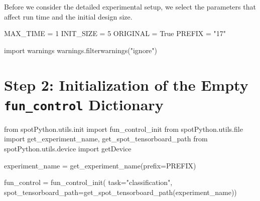 \documentclass[
  letterpaper,
  DIV=11,
  numbers=noendperiod]{scrreprt}
\newenvironment{Shaded}{\begin{snugshade}}{\end{snugshade}}
\newcommand{\BuiltInTok}[1]{\textcolor[rgb]{0.00,0.23,0.31}{#1}}
\newcommand{\DecValTok}[1]{\textcolor[rgb]{0.68,0.00,0.00}{#1}}
\newcommand{\ImportTok}[1]{\textcolor[rgb]{0.00,0.46,0.62}{#1}}
\newcommand{\NormalTok}[1]{\textcolor[rgb]{0.00,0.23,0.31}{#1}}
\newcommand{\OperatorTok}[1]{\textcolor[rgb]{0.37,0.37,0.37}{#1}}
\newcommand{\StringTok}[1]{\textcolor[rgb]{0.13,0.47,0.30}{#1}}
\newcommand{\VariableTok}[1]{\textcolor[rgb]{0.07,0.07,0.07}{#1}}
\begin{document}
Before we consider the detailed experimental setup, we select the
parameters that affect run time and the initial design size.

\begin{Shaded}
\begin{Highlighting}[]
\NormalTok{MAX\_TIME }\OperatorTok{=} \DecValTok{1}
\NormalTok{INIT\_SIZE }\OperatorTok{=} \DecValTok{5}
\NormalTok{ORIGINAL }\OperatorTok{=} \VariableTok{True}
\NormalTok{PREFIX }\OperatorTok{=} \StringTok{"17"}
\end{Highlighting}
\end{Shaded}

\begin{Shaded}
\begin{Highlighting}[]
\ImportTok{import}\NormalTok{ warnings}
\NormalTok{warnings.filterwarnings(}\StringTok{"ignore"}\NormalTok{)}
\end{Highlighting}
\end{Shaded}

\hypertarget{step-2-initialization-of-the-empty-fun_control-dictionary-2}{%
\section{\texorpdfstring{Step 2: Initialization of the Empty
\texttt{fun\_control}
Dictionary}{Step 2: Initialization of the Empty fun\_control Dictionary}}\label{step-2-initialization-of-the-empty-fun_control-dictionary-2}}

\begin{Shaded}
\begin{Highlighting}[]
\ImportTok{from}\NormalTok{ spotPython.utils.init }\ImportTok{import}\NormalTok{ fun\_control\_init}
\ImportTok{from}\NormalTok{ spotPython.utils.}\BuiltInTok{file} \ImportTok{import}\NormalTok{ get\_experiment\_name, get\_spot\_tensorboard\_path}
\ImportTok{from}\NormalTok{ spotPython.utils.device }\ImportTok{import}\NormalTok{ getDevice}

\NormalTok{experiment\_name }\OperatorTok{=}\NormalTok{ get\_experiment\_name(prefix}\OperatorTok{=}\NormalTok{PREFIX)}

\NormalTok{fun\_control }\OperatorTok{=}\NormalTok{ fun\_control\_init(}
\NormalTok{    task}\OperatorTok{=}\StringTok{"classification"}\NormalTok{,}
\NormalTok{    spot\_tensorboard\_path}\OperatorTok{=}\NormalTok{get\_spot\_tensorboard\_path(experiment\_name))}
\end{Highlighting}
\end{Shaded}
\end{document}
